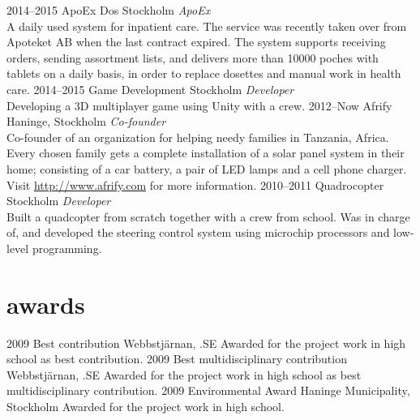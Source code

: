 \documentclass[]{friggeri-cv} %
\begin{document}
\begin{entrylist}
\entry
{2014--2015}
{ApoEx Dos}
{Stockholm}
{\emph{ApoEx} \\
A daily used system for inpatient care. The service was recently taken over from Apoteket AB when the last contract expired. The system supports receiving orders, sending assortment lists, and delivers more than 10000 poches with tablets on a daily basis, in order to replace dosettes and manual work in health care. }
\entry
{2014--2015}
{Game Development}
{Stockholm}
{\emph{Developer} \\
Developing a 3D multiplayer game using Unity with a crew.}
\entry
{2012--Now}
{Afrify}
{Haninge, Stockholm}
{\emph{Co-founder} \\
Co-founder of an organization for helping needy families in Tanzania, Africa. Every chosen family gets a complete installation of a solar panel system in their home; consisting of a car battery, a pair of LED lamps and a cell phone charger. Visit \href{http://www.afrify.com}{http://www.afrify.com} for more information.}
\entry
{2010--2011}
{Quadrocopter}
{Stockholm}
{\emph{Developer} \\
Built a quadcopter from scratch together with a crew from school. Was in charge of, and developed the steering control system using microchip processors and low-level programming.}
\end{entrylist}


\section{awards}

\begin{entrylist}
\entry
{2009}
{Best contribution}
{Webbstjärnan, .SE}
{Awarded for the project work in high school as best contribution.}
\entry
{2009}
{Best multidisciplinary contribution}
{Webbstjärnan, .SE}
{Awarded for the project work in high school as best multidisciplinary contribution.}
\entry
{2009}
{Environmental Award}
{Haninge Municipality, Stockholm}
{Awarded for the project work in high school.}
\end{entrylist}
\end{document}
